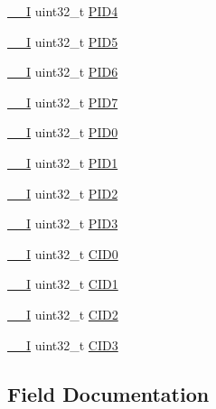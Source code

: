 \begin{DoxyCompactItemize}
\item 
\hyperlink{LPC17xx_8h_af63697ed9952cc71e1225efe205f6cd3}{\+\_\+\+\_\+I} uint32\+\_\+t \hyperlink{structITM__Type_accfc7de00b0eaba0301e8f4553f70512}{P\+I\+D4}
\item 
\hyperlink{LPC17xx_8h_af63697ed9952cc71e1225efe205f6cd3}{\+\_\+\+\_\+I} uint32\+\_\+t \hyperlink{structITM__Type_a9353055ceb7024e07d59248e54502cb9}{P\+I\+D5}
\item 
\hyperlink{LPC17xx_8h_af63697ed9952cc71e1225efe205f6cd3}{\+\_\+\+\_\+I} uint32\+\_\+t \hyperlink{structITM__Type_a755c0ec919e7dbb5f7ff05c8b56a3383}{P\+I\+D6}
\item 
\hyperlink{LPC17xx_8h_af63697ed9952cc71e1225efe205f6cd3}{\+\_\+\+\_\+I} uint32\+\_\+t \hyperlink{structITM__Type_aa31ca6bb4b749201321b23d0dbbe0704}{P\+I\+D7}
\item 
\hyperlink{LPC17xx_8h_af63697ed9952cc71e1225efe205f6cd3}{\+\_\+\+\_\+I} uint32\+\_\+t \hyperlink{structITM__Type_ab69ade751350a7758affdfe396517535}{P\+I\+D0}
\item 
\hyperlink{LPC17xx_8h_af63697ed9952cc71e1225efe205f6cd3}{\+\_\+\+\_\+I} uint32\+\_\+t \hyperlink{structITM__Type_a30e87ec6f93ecc9fe4f135ca8b068990}{P\+I\+D1}
\item 
\hyperlink{LPC17xx_8h_af63697ed9952cc71e1225efe205f6cd3}{\+\_\+\+\_\+I} uint32\+\_\+t \hyperlink{structITM__Type_ae139d2e588bb382573ffcce3625a88cd}{P\+I\+D2}
\item 
\hyperlink{LPC17xx_8h_af63697ed9952cc71e1225efe205f6cd3}{\+\_\+\+\_\+I} uint32\+\_\+t \hyperlink{structITM__Type_af006ee26c7e61c9a3712a80ac74a6cf3}{P\+I\+D3}
\item 
\hyperlink{LPC17xx_8h_af63697ed9952cc71e1225efe205f6cd3}{\+\_\+\+\_\+I} uint32\+\_\+t \hyperlink{structITM__Type_a413f3bb0a15222e5f38fca4baeef14f6}{C\+I\+D0}
\item 
\hyperlink{LPC17xx_8h_af63697ed9952cc71e1225efe205f6cd3}{\+\_\+\+\_\+I} uint32\+\_\+t \hyperlink{structITM__Type_a5f7d524b71f49e444ff0d1d52b3c3565}{C\+I\+D1}
\item 
\hyperlink{LPC17xx_8h_af63697ed9952cc71e1225efe205f6cd3}{\+\_\+\+\_\+I} uint32\+\_\+t \hyperlink{structITM__Type_adee4ccce1429db8b5db3809c4539f876}{C\+I\+D2}
\item 
\hyperlink{LPC17xx_8h_af63697ed9952cc71e1225efe205f6cd3}{\+\_\+\+\_\+I} uint32\+\_\+t \hyperlink{structITM__Type_a0e7aa199619cc7ac6baddff9600aa52e}{C\+I\+D3}
\end{DoxyCompactItemize}


\subsection{Field Documentation}
